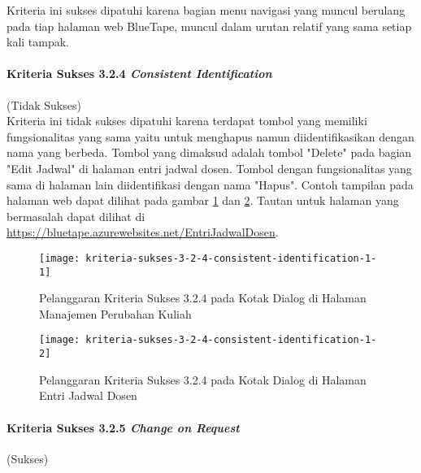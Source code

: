 Kriteria ini sukses dipatuhi karena bagian menu navigasi yang muncul berulang pada tiap halaman web BlueTape, muncul dalam urutan relatif yang sama setiap kali tampak.

\paragraph{Kriteria Sukses 3.2.4 \textit{Consistent Identification}}
\label{par:kepatuhan_bluetape_kriteria_sukses_3.2.4}
(Tidak Sukses)\\

Kriteria ini tidak sukses dipatuhi karena terdapat tombol yang memiliki fungsionalitas yang sama yaitu untuk menghapus namun diidentifikasikan dengan nama yang berbeda. Tombol yang dimaksud adalah tombol "Delete" pada bagian "Edit Jadwal" di halaman entri jadwal dosen. Tombol dengan fungsionalitas yang sama di halaman lain diidentifikasi dengan nama "Hapus". Contoh tampilan pada halaman web dapat dilihat pada gambar \ref{fig:3.2.4_consistent_identification_1} dan \ref{fig:3.2.4_consistent_identification_2}. Tautan untuk halaman yang bermasalah dapat dilihat di \url{https://bluetape.azurewebsites.net/EntriJadwalDosen}.

\begin{figure}[H]
    \centering  
    \texttt{[image: kriteria-sukses-3-2-4-consistent-identification-1-1]}  
    \caption[Pelanggaran Kriteria Sukses 3.2.4 pada Kotak Dialog di Halaman Manajemen Perubahan Kuliah]{Pelanggaran Kriteria Sukses 3.2.4 pada Kotak Dialog di Halaman Manajemen Perubahan Kuliah}
    \label{fig:3.2.4_consistent_identification_1}  
\end{figure}

\begin{figure}[H]
    \centering  
    \texttt{[image: kriteria-sukses-3-2-4-consistent-identification-1-2]}  
    \caption[Pelanggaran Kriteria Sukses 3.2.4 pada Kotak Dialog di Halaman Entri Jadwal Dosen]{Pelanggaran Kriteria Sukses 3.2.4 pada Kotak Dialog di Halaman Entri Jadwal Dosen}
    \label{fig:3.2.4_consistent_identification_2}  
\end{figure}

\paragraph{Kriteria Sukses 3.2.5 \textit{Change on Request}}
\label{par:kepatuhan_bluetape_kriteria_sukses_3.2.5}
(Sukses)\\

